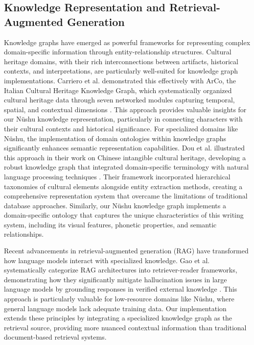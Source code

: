\documentclass{article}
\begin{document}
\subsection{Knowledge Representation and Retrieval-Augmented Generation}
\label{ssec:kg_rag}
    Knowledge graphs have emerged as powerful frameworks for representing complex domain-specific information through entity-relationship structures. Cultural heritage domains, with their rich interconnections between artifacts, historical contexts, and interpretations, are particularly well-suited for knowledge graph implementations. Carriero et al. demonstrated this effectively with ArCo, the Italian Cultural Heritage Knowledge Graph, which systematically organized cultural heritage data through seven networked modules capturing temporal, spatial, and contextual dimensions \cite{carrieroArCoItalianCultural2019}. This approach provides valuable insights for our N\"{u}shu knowledge representation, particularly in connecting characters with their cultural contexts and historical significance.
    For specialized domains like N\"{u}shu, the implementation of domain ontologies within knowledge graphs significantly enhances semantic representation capabilities. Dou et al. illustrated this approach in their work on Chinese intangible cultural heritage, developing a robust knowledge graph that integrated domain-specific terminology with natural language processing techniques \cite{douKnowledgeGraphBased2018}. Their framework incorporated hierarchical taxonomies of cultural elements alongside entity extraction methods, creating a comprehensive representation system that overcame the limitations of traditional database approaches. Similarly, our N\"{u}shu knowledge graph implements a domain-specific ontology that captures the unique characteristics of this writing system, including its visual features, phonetic properties, and semantic relationships.
    
    Recent advancements in retrieval-augmented generation (RAG) have transformed how language models interact with specialized knowledge. Gao et al. systematically categorize RAG architectures into retriever-reader frameworks, demonstrating how they significantly mitigate hallucination issues in large language models by grounding responses in verified external knowledge \cite{gaoRetrievalAugmentedGenerationLarge2024}. This approach is particularly valuable for low-resource domains like N\"{u}shu, where general language models lack adequate training data. Our implementation extends these principles by integrating a specialized knowledge graph as the retrieval source, providing more nuanced contextual information than traditional document-based retrieval systems.
    
\end{document}
